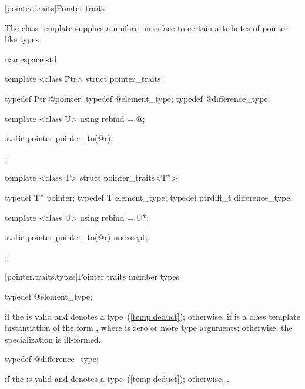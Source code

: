 [pointer.traits]{Pointer traits}

\pnum
The class template  supplies a uniform interface to certain
attributes of pointer-like types.

%
\begin{codeblock}
namespace std {
  template <class Ptr> struct pointer_traits {
    typedef Ptr @\itcorr@      pointer;
    typedef @\seebelow@ element_type;
    typedef @\seebelow@ difference_type;

    template <class U> using rebind = @\seebelow@;

    static pointer pointer_to(@\seebelow@ r);
  };

  template <class T> struct pointer_traits<T*> {
    typedef T*        pointer;
    typedef T         element_type;
    typedef ptrdiff_t difference_type;

    template <class U> using rebind = U*;

    static pointer pointer_to(@\seebelow@ r) noexcept;
  };
}
\end{codeblock}

[pointer.traits.types]{Pointer traits member types}

%
%
\begin{itemdecl}
typedef @\seebelow@ element_type;
\end{itemdecl}

\begin{itemdescr}
\pnum
\ctype {} if
the   is valid and denotes a
type~(\ref{temp.deduct}); otherwise,  if
 is a class template instantiation of the form ,
where  is zero or more type arguments; otherwise, the specialization is
ill-formed.
\end{itemdescr}

%
%
\begin{itemdecl}
typedef @\seebelow@ difference_type;
\end{itemdecl}

\begin{itemdescr}
\pnum
\ctype {} if
the   is valid and denotes a
type~(\ref{temp.deduct}); otherwise,
.
\end{itemdescr}

